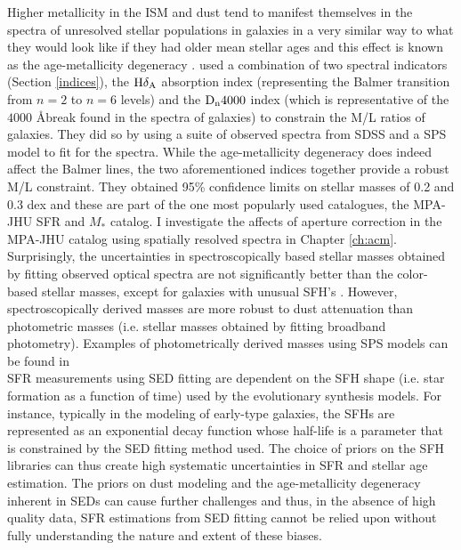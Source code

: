 Higher metallicity in the ISM and dust tend to manifest themselves in the spectra of unresolved stellar populations in galaxies in a very similar way to what they would look like if they had older mean stellar ages and this effect is known as the age-metallicity degeneracy \citep{worthey_comprehensive_1994}. \citet{kauffmann_stellar_2003} used a combination of two spectral indicators (Section \ref{indices}), the ${\rm H}\delta_{\rm A}$ absorption index (representing the Balmer transition from $n = 2$ to $n = 6$ levels) and the ${\rm D}_{\rm n} 4000$ index (which is representative of the $4000$ \AA break found in the spectra of galaxies) to constrain the M/L ratios of galaxies. They did so by using a suite of observed spectra from SDSS and a SPS model to fit for the spectra. While the age-metallicity degeneracy does indeed affect the Balmer lines, the two aforementioned indices together provide a robust M/L constraint. They obtained 95\%  confidence limits on stellar masses of 0.2 and 0.3 dex and these are part of the one most popularly used catalogues, the MPA-JHU SFR and $M_{*}$ catalog. I investigate the affects of aperture correction in the MPA-JHU catalog using spatially resolved spectra in Chapter \ref{ch:acm}.\\

Surprisingly, the uncertainties in spectroscopically based stellar masses obtained by fitting observed optical spectra \citep{kauffmann_stellar_2003, 2012MNRAS.421..314C} are not significantly better than the color-based stellar masses, except for galaxies with unusual SFH's \citet{2005MNRAS.362...41G}. However, spectroscopically derived masses are more robust to dust attenuation than photometric masses (i.e. stellar masses obtained by fitting broadband photometry). Examples of photometrically derived masses using SPS models can be found in \citet{2004ApJ...616L.103D, 2007AJ....133..734B}\\

SFR measurements using SED fitting are dependent on the SFH shape (i.e. star formation as a function of time) used by the evolutionary synthesis models. For instance, typically in the modeling of early-type galaxies, the SFHs are represented as an exponential decay function whose half-life is a parameter that is constrained by the SED fitting method used. The choice of priors on the SFH libraries can thus create high systematic uncertainties in SFR and stellar age estimation. The priors on dust modeling and the age-metallicity degeneracy inherent in SEDs can cause further challenges and thus, in the absence of high quality data, SFR estimations from SED fitting cannot be relied upon without fully understanding the nature and extent of these biases.\\

